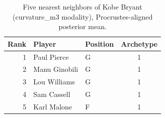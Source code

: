 \begin{table}[htbp]
  \centering\small
  \begin{tabular}{rllc}
    \toprule
    Rank & Player & Position & Archetype \\
    \midrule
    1 & Paul Pierce & G & 1 \\
    2 & Manu Ginobili & G & 1 \\
    3 & Lou Williams & G & 1 \\
    4 & Sam Cassell & G & 1 \\
    5 & Karl Malone & F & 1 \\
    \bottomrule
  \end{tabular}
  \caption{Five nearest neighbors of Kobe Bryant (curvature_m3 modality), Procrustes-aligned posterior mean.}
  \label{tab:Kobe_Bryant_neighbors_curvature_m3}
\end{table}

